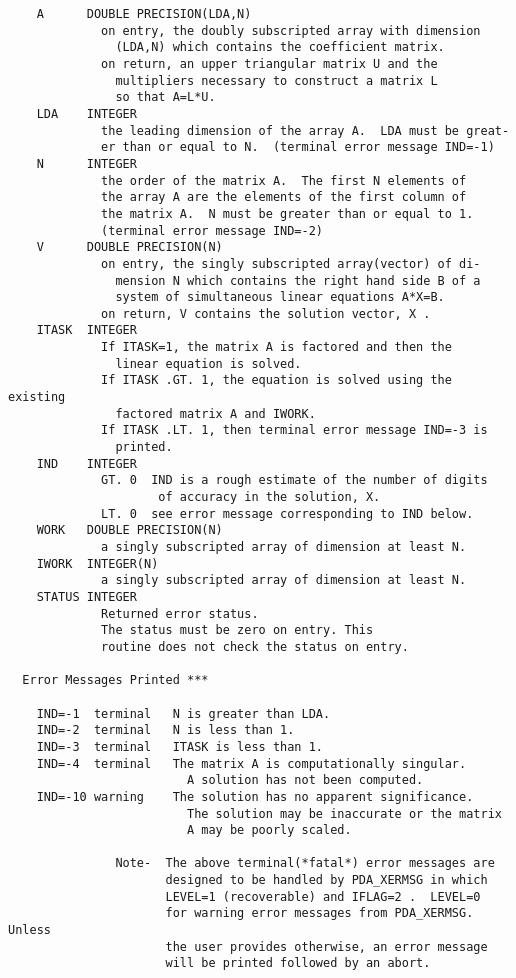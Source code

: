\begin{verbatim}
    A      DOUBLE PRECISION(LDA,N)
             on entry, the doubly subscripted array with dimension
               (LDA,N) which contains the coefficient matrix.
             on return, an upper triangular matrix U and the
               multipliers necessary to construct a matrix L
               so that A=L*U.
    LDA    INTEGER
             the leading dimension of the array A.  LDA must be great-
             er than or equal to N.  (terminal error message IND=-1)
    N      INTEGER
             the order of the matrix A.  The first N elements of
             the array A are the elements of the first column of
             the matrix A.  N must be greater than or equal to 1.
             (terminal error message IND=-2)
    V      DOUBLE PRECISION(N)
             on entry, the singly subscripted array(vector) of di-
               mension N which contains the right hand side B of a
               system of simultaneous linear equations A*X=B.
             on return, V contains the solution vector, X .
    ITASK  INTEGER
             If ITASK=1, the matrix A is factored and then the
               linear equation is solved.
             If ITASK .GT. 1, the equation is solved using the existing
               factored matrix A and IWORK.
             If ITASK .LT. 1, then terminal error message IND=-3 is
               printed.
    IND    INTEGER
             GT. 0  IND is a rough estimate of the number of digits
                     of accuracy in the solution, X.
             LT. 0  see error message corresponding to IND below.
    WORK   DOUBLE PRECISION(N)
             a singly subscripted array of dimension at least N.
    IWORK  INTEGER(N)
             a singly subscripted array of dimension at least N.
    STATUS INTEGER
             Returned error status.
             The status must be zero on entry. This
             routine does not check the status on entry.

  Error Messages Printed ***

    IND=-1  terminal   N is greater than LDA.
    IND=-2  terminal   N is less than 1.
    IND=-3  terminal   ITASK is less than 1.
    IND=-4  terminal   The matrix A is computationally singular.
                         A solution has not been computed.
    IND=-10 warning    The solution has no apparent significance.
                         The solution may be inaccurate or the matrix
                         A may be poorly scaled.

               Note-  The above terminal(*fatal*) error messages are
                      designed to be handled by PDA_XERMSG in which
                      LEVEL=1 (recoverable) and IFLAG=2 .  LEVEL=0
                      for warning error messages from PDA_XERMSG.  Unless
                      the user provides otherwise, an error message
                      will be printed followed by an abort.


\end{verbatim}
